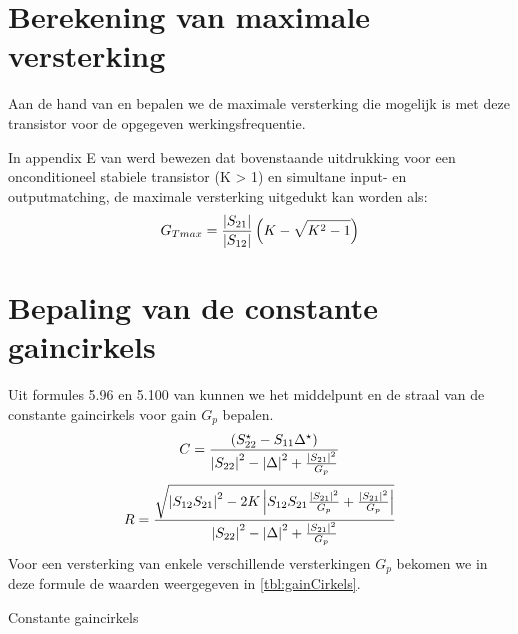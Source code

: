   

\section{Berekening van maximale versterking}
  Aan de hand van \cite{Pozar} en \cite{Gonzalez} bepalen we de maximale
  versterking die mogelijk is met deze transistor voor
  de opgegeven werkingsfrequentie.
  
  In appendix E van \cite{Gonzalez} werd bewezen dat bovenstaande uitdrukking
  voor een onconditioneel stabiele transistor (K > 1) en simultane input- en
  outputmatching, de maximale versterking uitgedukt
  kan worden als:
  \[
    G_{Tmax} = \frac{\left| S_{21} \right|}{\left| S_{12} \right|} \left( K - \sqrt{K^2-1}\right)
  \]
  
  
  \section{Bepaling van de constante gaincirkels}
  Uit formules 5.96 en 5.100 van \cite{lessen} kunnen we het middelpunt en de
  straal van de constante gaincirkels voor gain $G_p$ bepalen.
  \[
    C = \frac{\left( S_{22}^{\star} - S_{11} \Delta^{\star} \right)}{\left| S_{22} \right|^2 - \left| \Delta \right|^2 + \frac{\left| S_{21} \right|^ 2}{G_p}}
  \]
  \[
    R = \frac{\sqrt{\left| S_{12} S_{21} \right|^2 - 2 K \left| S_{12} S_{21} \frac{\left| S_{21} \right|^2}{G_p} + \frac{\left| S_{21} \right|^2}{G_p}  \right|}}{\left| S_{22} \right|^2 - \left| \Delta \right|^2 + \frac{\left| S_{21} \right|^2}{G_p}}
  \]
  Voor een versterking van enkele verschillende versterkingen $G_p$ bekomen we
  in deze formule de waarden weergegeven in \autoref{tbl:gainCirkels}.
    \begin{table}[h!]
    \begin{center}
    \caption{Constante gaincirkels}
    \label{tbl:gainCirkels}
    
    \end{center}
    \end{table}
  
